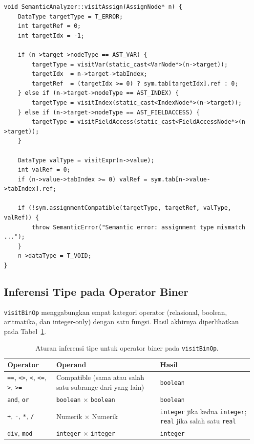 \documentclass[11pt,a4paper]{article}
\begin{document}
\begin{lstlisting}
void SemanticAnalyzer::visitAssign(AssignNode* n) {
    DataType targetType = T_ERROR;
    int targetRef = 0;
    int targetIdx = -1;

    if (n->target->nodeType == AST_VAR) {
        targetType = visitVar(static_cast<VarNode*>(n->target));
        targetIdx  = n->target->tabIndex;
        targetRef  = (targetIdx >= 0) ? sym.tab[targetIdx].ref : 0;
    } else if (n->target->nodeType == AST_INDEX) {
        targetType = visitIndex(static_cast<IndexNode*>(n->target));
    } else if (n->target->nodeType == AST_FIELDACCESS) {
        targetType = visitFieldAccess(static_cast<FieldAccessNode*>(n->target));
    }

    DataType valType = visitExpr(n->value);
    int valRef = 0;
    if (n->value->tabIndex >= 0) valRef = sym.tab[n->value->tabIndex].ref;

    if (!sym.assignmentCompatible(targetType, targetRef, valType, valRef)) {
        throw SemanticError("Semantic error: assignment type mismatch ...");
    }
    n->dataType = T_VOID;
}
\end{lstlisting}

\subsection{Inferensi Tipe pada Operator Biner}

\texttt{visitBinOp} menggabungkan empat kategori operator (relasional,
boolean, aritmatika, dan integer-only) dengan satu fungsi. Hasil akhirnya
diperlihatkan pada Tabel~\ref{tab:binop-rule}.

\begin{table}[H]
\centering
\footnotesize
\begin{tabularx}{\textwidth}{l l X}
\toprule
\textbf{Operator} & \textbf{Operand} & \textbf{Hasil} \\
\midrule
\texttt{==}, \texttt{<>}, \texttt{<}, \texttt{<=}, \texttt{>}, \texttt{>=}
    & Compatible (sama atau salah satu subrange dari yang lain)
    & \texttt{boolean} \\
\texttt{and}, \texttt{or}
    & \texttt{boolean} $\times$ \texttt{boolean}
    & \texttt{boolean} \\
\texttt{+}, \texttt{-}, \texttt{*}, \texttt{/}
    & Numerik $\times$ Numerik
    & \texttt{integer} jika kedua \texttt{integer}; \texttt{real} jika salah
      satu \texttt{real} \\
\texttt{div}, \texttt{mod}
    & \texttt{integer} $\times$ \texttt{integer}
    & \texttt{integer} \\
\bottomrule
\end{tabularx}
\caption{Aturan inferensi tipe untuk operator biner pada \texttt{visitBinOp}.}
\label{tab:binop-rule}
\end{table}
\end{document}
